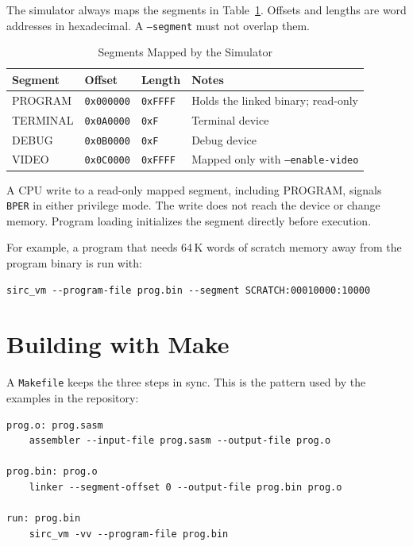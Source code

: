 The simulator always maps the segments in Table~\ref{tab:fixed-segments}. Offsets and lengths are word addresses in
hexadecimal. A \texttt{--segment} must not overlap them.

\begin{table}[H]
	\centering
	\begin{tabular}{llll}
		\toprule
		Segment  & Offset            & Length          & Notes                                    \\
		\midrule
		PROGRAM  & \texttt{0x000000} & \texttt{0xFFFF} & Holds the linked binary; read-only       \\
		TERMINAL & \texttt{0x0A0000} & \texttt{0xF}    & Terminal device                          \\
		DEBUG    & \texttt{0x0B0000} & \texttt{0xF}    & Debug device                             \\
		VIDEO    & \texttt{0x0C0000} & \texttt{0xFFFF} & Mapped only with \texttt{--enable-video} \\
		\bottomrule
	\end{tabular}
	\caption{Segments Mapped by the Simulator}
	\label{tab:fixed-segments}
\end{table}

A CPU write to a read-only mapped segment, including PROGRAM, signals \texttt{BPER} in either privilege mode. The write
does not reach the device or change memory. Program loading initializes the segment directly before execution.

For example, a program that needs 64\,K words of scratch memory away from the program binary is run with:

\begin{lstlisting}[language={}]
sirc_vm --program-file prog.bin --segment SCRATCH:00010000:10000
\end{lstlisting}

\section{Building with Make}

A \texttt{Makefile} keeps the three steps in sync. This is the pattern used by the examples in the repository:

\begin{lstlisting}[language={}]
prog.o: prog.sasm
	assembler --input-file prog.sasm --output-file prog.o

prog.bin: prog.o
	linker --segment-offset 0 --output-file prog.bin prog.o

run: prog.bin
	sirc_vm -vv --program-file prog.bin
\end{lstlisting}
